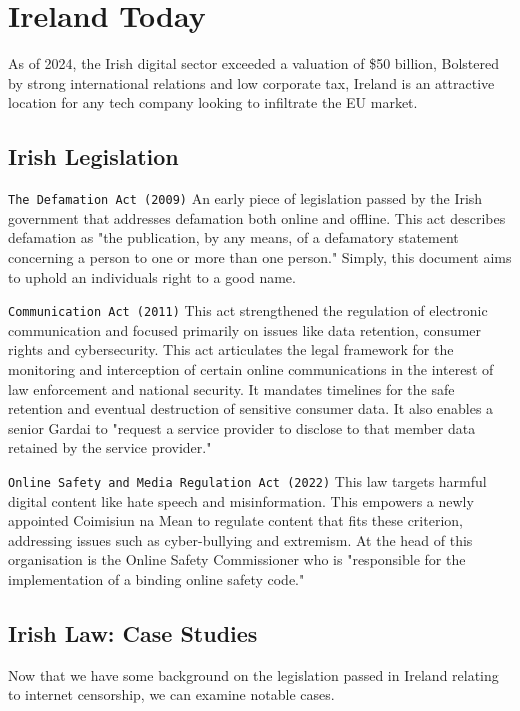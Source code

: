 \section{Ireland Today}
As of 2024, the Irish digital sector exceeded a valuation of \$50 billion, \cite{tradegov2025} Bolstered by strong international relations and low corporate tax, Ireland is an attractive location for any tech company looking to infiltrate the EU market. 

\subsection{Irish Legislation}
\texttt{The Defamation Act (2009)}
An early piece of legislation passed by the Irish government that addresses defamation both online and offline. This act describes defamation as "the publication, by any means, of a defamatory statement concerning a person to one or more than one person." \cite{defamation2009} Simply, this document aims to uphold an individuals right to a good name.

\texttt{Communication Act (2011)}
This act strengthened the regulation of electronic communication and focused primarily on issues like data retention, consumer rights and cybersecurity. This act articulates the legal framework for the monitoring and interception of certain online communications in the interest of law enforcement and national security. It mandates timelines for the safe retention and eventual destruction of sensitive consumer data. It also enables a senior Gardai to "request a service provider to disclose to that member data retained by the service provider." \cite{communications2011}

\texttt{Online Safety and Media Regulation Act (2022)}
This law targets harmful digital content like hate speech and misinformation. This empowers a newly appointed Coimisiun na Mean to regulate content that fits these criterion, addressing issues such as cyber-bullying and extremism. At the head of this organisation is the Online Safety Commissioner who is "responsible for the implementation of a binding online safety code." \cite{onlinesafety2022}

\subsection{Irish Law: Case Studies}
Now that we have some background on the legislation passed in Ireland relating to internet censorship, we can examine notable cases. 

